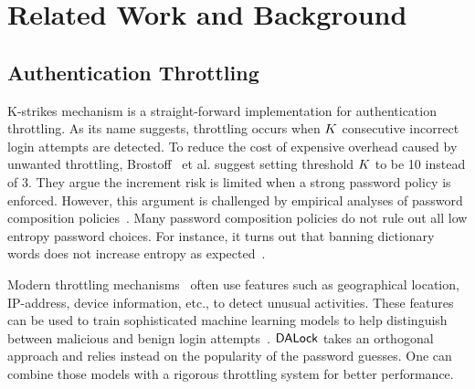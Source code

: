 

\section{Related Work and Background}\label{sec: relatedwork}


\subsection{Authentication Throttling} \label{related: Throttling}


 K-strikes mechanism is a straight-forward implementation for authentication throttling. As its name suggests, throttling occurs when $K$ consecutive incorrect login attempts are detected.  To reduce the cost of expensive overhead caused by unwanted throttling, Brostoff~\cite{brostoff2003ten} et al. suggest setting threshold $K$ to be 10 instead of 3. They argue the increment risk is limited when a strong password policy is enforced. However, this argument is challenged by empirical analyses of password composition policies~\cite{KSKMBCCE:SIGCHI11, BKPS:ACMEC13}. Many password composition policies do not rule out all low entropy password choices. For instance, it turns out that banning dictionary words does not increase entropy as expected~\cite{KSKMBCCE:SIGCHI11}.

 Modern throttling mechanisms~\cite{sandhu2005system, gordon2014efficiently} often use features such as geographical location, IP-address, device information, etc., to detect unusual activities. These features can be used to train sophisticated machine learning models to help distinguish between malicious and benign login attempts~\cite{NDSS:FJDBG16}. $\mathsf{DALock}$ takes an orthogonal approach and relies instead on the popularity of the password guesses. One can combine those models with a rigorous throttling system for better performance.

